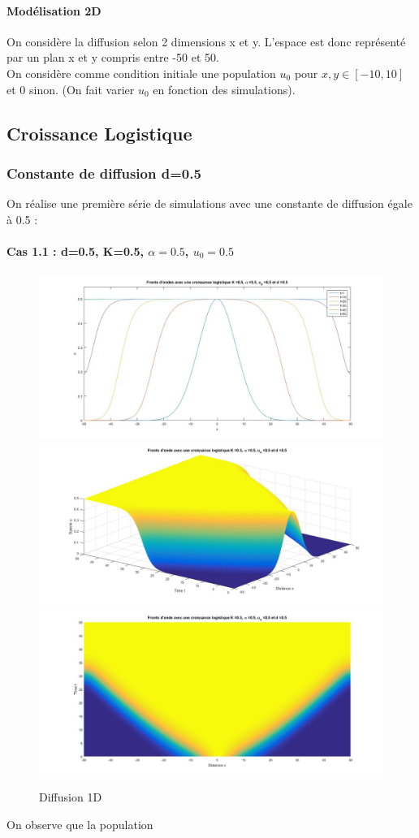 \documentclass[a4paper,11pt]{article}
\begin{document}
\paragraph{Modélisation 2D}
On considère la diffusion selon 2 dimensions x et y. L'espace est donc représenté par un plan x et y compris entre -50 et 50.\\
On considère comme condition initiale une population $u_0$ pour $x,y\in[-10,10]$ et 0 sinon. (On fait varier $u_0$ en fonction des simulations).
\subsection{Croissance Logistique}

\subsubsection{Constante de diffusion d=0.5}
On réalise une première série de simulations avec une constante de diffusion égale à 0.5 :
\paragraph{Cas 1.1 : d=0.5, K=0.5, $\alpha =0.5$, $u_0=0.5$}
\noindent
\begin{figure}[H]
	\centering

	\includegraphics[width=0.45\linewidth]{SimulationKPP/KPP11}\hfill
	\includegraphics[width=0.45\linewidth]{SimulationKPP/KPP12.jpg}
    \includegraphics[width=0.45\linewidth]{SimulationKPP/KPP14.jpg}
    \caption{Diffusion 1D}
\end{figure}
\noindent
On observe que la population 
\end{document}
